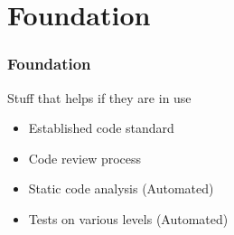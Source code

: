 \documentclass{beamer}
\begin{document}
\section{Foundation}
\begin{frame}
  \frametitle{Foundation}
  Stuff that helps if they are in use
  \begin{itemize}
    \item Established code standard
    \item Code review process
    \item Static code analysis (Automated)
    \item Tests on various levels (Automated)
  \end{itemize}
\end{frame}

\end{document}
